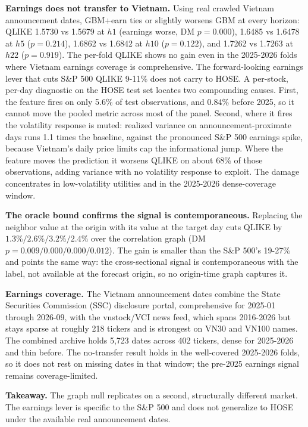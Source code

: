 \documentclass{llncs}
\begin{document}
\textbf{Earnings does not transfer to Vietnam.} Using real crawled Vietnam announcement dates, GBM+earn ties or
slightly worsens GBM at every horizon: QLIKE 1.5730 vs 1.5679 at $h1$ (earnings worse, DM $p=0.000$), 1.6485 vs
1.6478 at $h5$ ($p=0.214$), 1.6862 vs 1.6842 at $h10$ ($p=0.122$), and 1.7262 vs 1.7263 at $h22$ ($p=0.919$). The per-fold
QLIKE shows no gain even in the 2025-2026 folds where Vietnam earnings coverage is comprehensive. The
forward-looking earnings lever that cuts S\&P 500 QLIKE 9-11\% does not carry to HOSE. A per-stock, per-day
diagnostic on the HOSE test set locates two compounding causes. First, the feature fires on only 5.6\% of test
observations, and 0.84\% before 2025, so it cannot move the pooled metric across most of the panel. Second, where
it fires the volatility response is muted: realized variance on announcement-proximate days runs 1.1 times the
baseline, against the pronounced S\&P 500 earnings spike, because Vietnam's daily price limits cap the
informational jump. Where the feature moves the prediction it worsens QLIKE on about 68\% of those observations,
adding variance with no volatility response to exploit. The damage concentrates in low-volatility utilities and in
the 2025-2026 dense-coverage window.

\textbf{The oracle bound confirms the signal is contemporaneous.} Replacing the neighbor value at the origin with its
value at the target day cuts QLIKE by $1.3\%/2.6\%/3.2\%/2.4\%$ over the correlation graph (DM $p=0.009/0.000/0.000/0.012$).
The gain is smaller than the S\&P 500's 19-27\% and points the same way: the cross-sectional signal is
contemporaneous with the label, not available at the forecast origin, so no origin-time graph captures it.

\textbf{Earnings coverage.} The Vietnam announcement dates combine the State Securities Commission (SSC) disclosure
portal, comprehensive for 2025-01 through 2026-09, with the vnstock/VCI news feed, which spans 2016-2026 but
stays sparse at roughly 218 tickers and is strongest on VN30 and VN100 names. The combined archive holds 5,723
dates across 402 tickers, dense for 2025-2026 and thin before. The no-transfer result holds in the well-covered
2025-2026 folds, so it does not rest on missing dates in that window; the pre-2025 earnings signal remains
coverage-limited.

\textbf{Takeaway.} The graph null replicates on a second, structurally different market. The earnings lever is
specific to the S\&P 500 and does not generalize to HOSE under the available real announcement dates.
\end{document}
